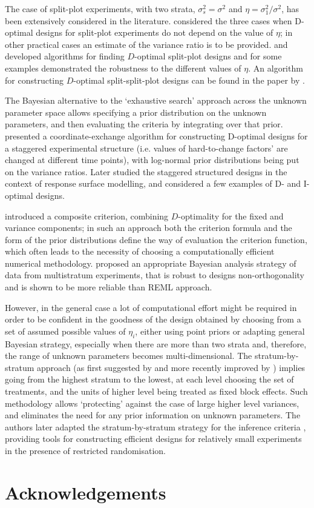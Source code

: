 \documentclass[11pt]{article}
\begin{document}
The case of split-plot experiments, with two strata, $\sigma^2_{s}=\sigma^2$ and $\eta=\sigma^2_{1}/\sigma^2$, has been extensively considered in the literature. \cite{Goos2001Doptimal} considered the three cases when D-optimal designs for split-plot experiments do not depend on the value of $\eta$; in other practical cases an estimate of the variance ratio is to be provided. \cite{Goos2003Doptimal} and \cite{Jones2007candidate} developed algorithms for finding $D$-optimal split-plot designs and for some examples demonstrated the robustness to the different values of $\eta$. An algorithm for constructing $D$-optimal split-split-plot designs can be found in the paper by \cite{Jones2009Doptimal}. 

The Bayesian alternative to the `exhaustive search' approach across the unknown parameter space allows specifying a prior distribution on the unknown parameters, and then evaluating the criteria by integrating over that prior. \cite{Arnouts2012staggered} presented a coordinate-exchange algorithm for constructing D-optimal designs for a staggered experimental structure (i.e. values of hard-to-change factors' are changed at different time points), with log-normal prior distributions being put on the variance ratios. Later \cite{Arnouts2015staggered} studied the staggered structured designs in the context of response surface modelling, and considered a few examples of D- and I-optimal designs.
 
\cite{Mylona2014optimal} introduced a composite criterion, combining $D$-optimality for the fixed and variance components; in such an approach both the criterion formula and the form of the prior distributions define the way of evaluation the criterion function, which often leads to the necessity of choosing a computationally efficient numerical methodology. \cite{Gilmour2009analysis} proposed an appropriate Bayesian analysis strategy of data from multistratum experiments, that is robust to designs non-orthogonality and is shown to be more reliable than REML approach.  

However, in the general case a lot of computational effort might be required in order to be confident in the goodness of the design obtained by choosing from a set of assumed possible values of $\eta_i$, either using point priors or adapting general Bayesian strategy, especially when there are more than two strata and, therefore, the range of unknown parameters becomes multi-dimensional. The stratum-by-stratum approach (as first suggested by \cite{Trinca2001multistratum} and more recently improved by \cite{Trinca2015improved}) implies going from the highest stratum to the lowest, at each level choosing the set of treatments, and the units of higher level being treated as fixed block effects. Such methodology allows `protecting' against the case of large higher level variances, and eliminates the need for any prior information on unknown parameters. The authors later adapted the stratum-by-stratum  strategy for the inference criteria \citep{Trinca2016SPinference}, providing tools for constructing efficient designs for relatively small experiments in the presence of restricted randomisation.
\section{Acknowledgements}

\cleardoublepage
{}
{} 
%


\end{document}
